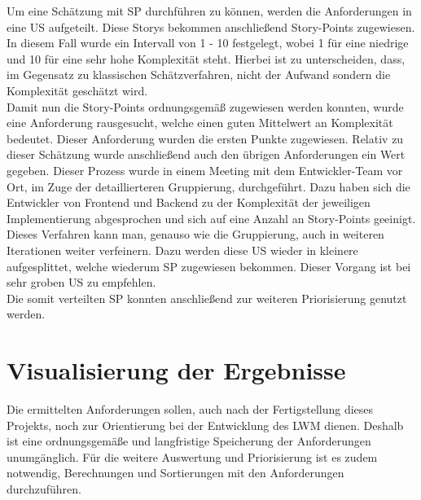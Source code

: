 Um eine Schätzung mit \acl{SP} durchführen zu können, werden die Anforderungen in eine \ac{US} aufgeteilt. Diese Storys bekommen anschließend Story-Points zugewiesen. In diesem Fall wurde ein Intervall von 1 - 10 festgelegt, wobei 1 für eine niedrige und 10 für eine sehr hohe Komplexität steht. Hierbei ist zu unterscheiden, dass, im Gegensatz zu klassischen Schätzverfahren, nicht der Aufwand sondern die Komplexität geschätzt wird. \\[1em]

Damit nun die Story-Points ordnungsgemäß zugewiesen werden konnten, wurde eine Anforderung rausgesucht, welche einen guten Mittelwert an Komplexität bedeutet. Dieser Anforderung wurden die ersten Punkte zugewiesen. Relativ zu dieser Schätzung wurde anschließend auch den übrigen Anforderungen ein Wert gegeben. Dieser Prozess wurde in einem Meeting mit dem Entwickler-Team vor Ort, im Zuge der detaillierteren Gruppierung, durchgeführt. Dazu haben sich die Entwickler von Frontend und Backend zu der Komplexität der jeweiligen Implementierung abgesprochen und sich auf eine Anzahl an Story-Points geeinigt. Dieses Verfahren kann man, genauso wie die Gruppierung, auch in weiteren Iterationen weiter verfeinern. Dazu werden diese \ac{US} wieder in kleinere aufgesplittet, welche wiederum \ac{SP} zugewiesen bekommen. Dieser Vorgang ist bei sehr groben \ac{US} zu empfehlen.\\[1em]

Die somit verteilten \ac{SP} konnten anschließend zur weiteren Priorisierung genutzt werden.

\chapter{Visualisierung der Ergebnisse}

Die ermittelten Anforderungen sollen, auch nach der Fertigstellung dieses Projekts, noch zur Orientierung bei der Entwicklung des \ac{LWM} dienen. Deshalb ist eine ordnungsgemäße und langfristige Speicherung der Anforderungen unumgänglich. Für die weitere Auswertung und Priorisierung ist es zudem notwendig, Berechnungen und Sortierungen mit den Anforderungen durchzuführen. \\[1em]

